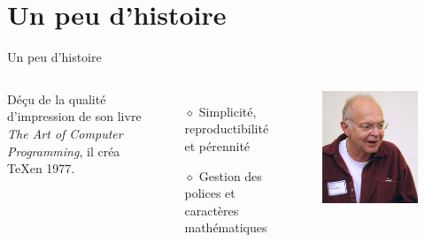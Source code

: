 
\section*{Un peu d'histoire}

\begin{frame}{Un peu d'histoire}
    \begin{columns}
        Déçu de la qualité d'impression de son livre \textit{The Art of Computer Programming},
        il créa \TeX\;en 1977.
        \vspace{0.5cm}
        \begin{itemize}
            \item[$\diamond$] Simplicité, reproductibilité et pérennité
            \item[$\diamond$] Gestion des polices et caractères mathématiques
        \end{itemize}
        \begin{figure}
           \centering
            \includegraphics[scale=0.35]{./figures/KnuthAtOpenContentAlliance.jpg}
            \caption{\cite{DON}}
            \label{fig: DONALD}
        \end{figure}
    \end{columns}
\end{frame}

